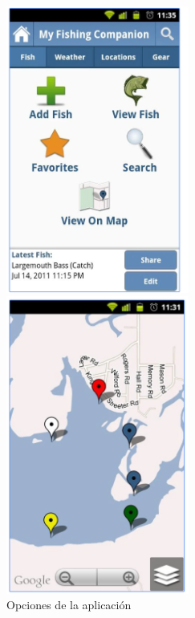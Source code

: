 \begin{figure}[htbp]
\begin{minipage}[b]{0.5\linewidth} %
\centering
\includegraphics[width=6cm]{pesca1.png}
\caption{ Opciones de la aplicación}
\label{fig:pesca1}
\end{minipage}
\hspace{0.5cm} %
\begin{minipage}[b]{0.5\linewidth}
\centering
\includegraphics[width=6cm]{pesca2.png}


\end{minipage}
\end{figure}
